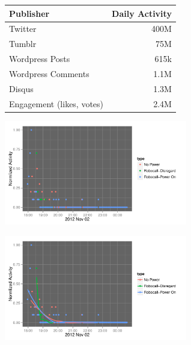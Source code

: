 \documentclass{beamer}
\begin{document}
\begin{frame} 
\begin{table}
\begin{tabular}{l|r}
\hline
   {Publisher}   &   {Daily Activity}   \\
\hline 
    Twitter      &      400M   \\
    Tumblr      &        75M   \\
    Wordpress Posts &     615k   \\
    Wordpress Comments & 1.1M \\
    Disqus       &       1.3M  \\
    Engagement (likes, votes) & 2.4M  \\
\hline
\end{tabular}
\end{table}
\end{frame}




\begin{frame}
\begin{center}
\end{center}
\end{frame}


\begin{frame}
  \begin{center}
    \includegraphics[width=8cm]{./imgs/fake.pdf}
  \end{center}
\end{frame}

\begin{frame}
  \begin{center}
    \includegraphics[width=8cm]{./imgs/fake_fit.pdf}
  \end{center}
\end{frame}
\end{document}
